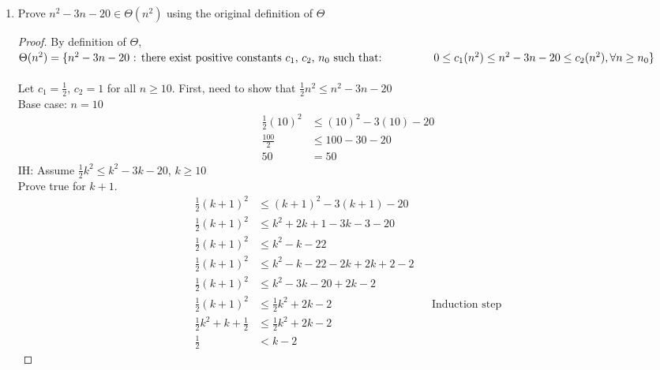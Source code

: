 \documentclass{article}
\begin{document}
\begin{enumerate}
\begin{enumerate}
\begin{proof}
                        \end{proof}
                \end{enumerate}
            \item Prove $n^2-3n-20\in\Theta(n^2)$ using the original definition of $\Theta$
                \begin{proof}
                    By definition of $\Theta$, \\$\Theta(n^2) = \{n^2-3n-20 \text{ : there exist positive constants } c_1 \text{, } c_2 \text{, } n_0 \text{ such that: }\\ 
                        \text{\hspace{1.5cm}}0\leq c_1(n^2)\leq n^2-3n-20\leq c_2(n^2), \forall n\geq n_0\}$
                    \\\\
                    Let $c_1 = \frac{1}{2}$, $c_2 = 1$ for all $n \geq 10$.
                    First, need to show that $\frac{1}{2}n^2\leq n^2-3n-20$\\
                    Base case: $n=10$
                    \begin{align*}
                        \frac{1}{2}(10)^2 &\leq (10)^2-3(10)-20\\
                        \frac{100}{2} &\leq 100-30-20\\
                        50 &= 50
                    \end{align*}
                    IH: Assume $\frac{1}{2}k^2 \leq k^2-3k-20$, $k\geq 10$\\
                    Prove true for $k+1$.
                    \begin{align*}
                        \frac{1}{2}(k+1)^2 &\leq (k+1)^2-3(k+1)-20\\
                        \frac{1}{2}(k+1)^2 &\leq k^2+2k+1-3k-3-20\\
                        \frac{1}{2}(k+1)^2 &\leq k^2-k-22 \\
                        \frac{1}{2}(k+1)^2 &\leq k^2-k-22-2k+2k+2-2 \\
                        \frac{1}{2}(k+1)^2 &\leq k^2-3k-20+2k-2 \\
                        \frac{1}{2}(k+1)^2 &\leq \frac{1}{2}k^2+2k-2 &&\text{Induction step}\\
                        \frac{1}{2}k^2 + k +\frac{1}{2} &\leq \frac{1}{2}k^2+2k-2 \\ 
                        \frac{1}{2} &< k-2
                    \end{align*}

\end{proof}
\end{enumerate}
\end{document}
